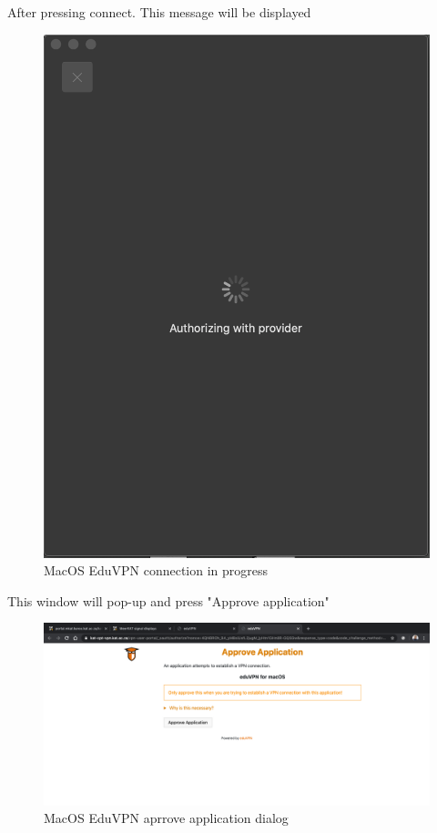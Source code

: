 After pressing connect. This message will be displayed
\begin{figure}[!thb]
	\centering
	\includegraphics[scale=0.8]{Chapters/images/image7.png}
	
	\caption{MacOS EduVPN connection in progress }
	\label{fig:image7}
\end{figure}
This window will pop-up and press "Approve application"


\begin{figure}[!thb]
	\centering
	\includegraphics[scale=0.8]{Chapters/images/image26.png}
	
	\caption{MacOS EduVPN aprrove application dialog }
	\label{fig:image26}
\end{figure}










